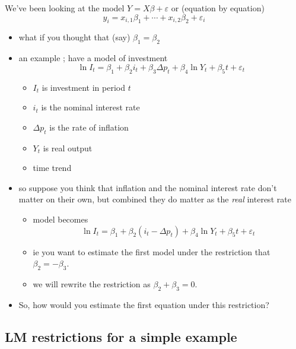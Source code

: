    We've been looking at the model $Y = X\beta + \varepsilon$ or
    (equation by equation) \[ y_i = x_{i,1} \beta_1 + \cdots +
    x_{i,2} \beta_2 + \varepsilon_i \]
\begin{itemize}
\item what if you thought that (say) $\beta_1 = \beta_2$
\item an example \citep[p. 81]{Gre_2011}; have a model of investment \[ \ln I_t
      = \beta_1 + \beta_2 i_t + \beta_3 \Delta p_t + \beta_4 \ln Y_t +
      \beta_5 t + \varepsilon_t \]
\begin{itemize}
\item $I_t$ is investment in period $t$
\item $i_t$ is the nominal interest rate
\item $\Delta p_t$ is the rate of inflation
\item $Y_t$ is real output
\item time trend
\end{itemize}
\item so suppose you think that inflation and the nominal interest rate
      don't matter on their own, but combined they do matter as the
      \emph{real} interest rate
\begin{itemize}
\item model becomes
        \[ \ln I_t = \beta_1 + \beta_2 (i_t - \Delta p_t) + \beta_4 \ln
        Y_t + \beta_5 t + \varepsilon_t \]
\item ie you want to estimate the first model under the restriction
        that $\beta_2 = - \beta_3$.
\item we will rewrite the restriction as $\beta_2 + \beta_3 = 0$.
\end{itemize}
\item So, how would you estimate the first equation under this
      restriction?
\end{itemize}

\subsection{LM restrictions for a simple example}

